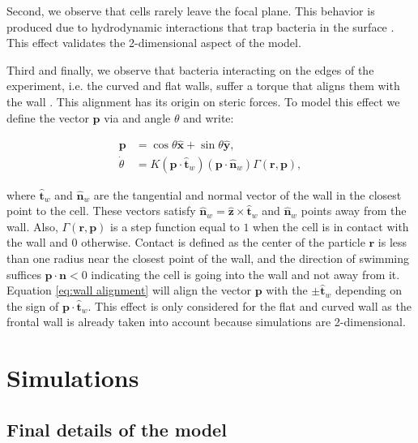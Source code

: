 Second, we observe that cells rarely leave the focal plane. This behavior is produced due to hydrodynamic interactions that trap bacteria in the surface \cite{Sipos2015HydrodynamicWalls, Li2011AccumulationSurface}. This effect validates the 2-dimensional aspect of the model. 

Third and finally, we observe that bacteria interacting on the edges of the experiment, i.e. the curved and flat walls, suffer a torque that aligns them with the wall \cite{Bianchi2017HolographicBacteria}. This alignment has its origin on steric forces. To model this effect we define the vector $\textbf{p}$ via and angle $\theta$ and write:

\begin{align}
    \textbf{p} &= \cos{\theta}\hat{\textbf{x}}+\sin{\theta}\hat{\textbf{y}}, \\
    \dot{\theta} &= K (\textbf{p} \cdot \hat{\textbf{t}}_w)  (\textbf{p} \cdot \hat{\textbf{n}}_w) \Gamma(\textbf{r}, \textbf{p}),
    \label{eq:wall alignment}
\end{align}

where $\hat{\textbf{t}}_w$ and $\hat{\textbf{n}}_w$ are the tangential and normal vector of the wall in the closest point to the cell. These vectors satisfy $\hat{\textbf{n}}_w = \hat{\textbf{z}} \times \hat{\textbf{t}}_w$ and $\hat{\textbf{n}}_w$ points away from the wall. Also, $\Gamma(\textbf{r}, \textbf{p})$ is a step function equal to $1$ when the cell is in contact with the wall and $0$ otherwise. Contact is defined as the center of the particle $\textbf{r}$ is less than one radius near the closest point of the wall, and the direction of swimming suffices $\textbf{p} \cdot \textbf{n} < 0$ indicating the cell is going into the wall and not away from it. Equation \eqref{eq:wall alignment} will align the vector $\textbf{p}$ with the $\pm\hat{\textbf{t}}_w$ depending on the sign of $\textbf{p} \cdot \hat{\textbf{t}}_w$. This effect is only considered for the flat and curved wall as the frontal wall is already taken into account because simulations are 2-dimensional.

\section{Simulations}
 
\subsection{Final details of the model}

